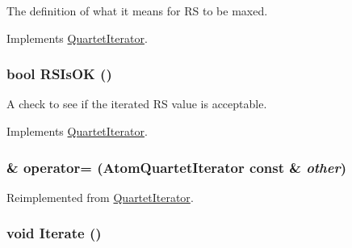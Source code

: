 The definition of what it means for RS to be maxed. 

Implements \hyperlink{classJKBuilder_1_1QuartetIterator_af88c46759ac710bbd36c17601dc62d55}{QuartetIterator}.\hypertarget{classJKBuilder_1_1AtomQuartetIterator_a13e657ea529c0566a0bf48e9c5a488d7}{
\subsubsection[{RSIsOK}]{\setlength{\rightskip}{0pt plus 5cm}bool RSIsOK ()}}
\label{classJKBuilder_1_1AtomQuartetIterator_a13e657ea529c0566a0bf48e9c5a488d7}


A check to see if the iterated RS value is acceptable. 

Implements \hyperlink{classJKBuilder_1_1QuartetIterator_ac51ff9a02f4a201598f7820476c52faf}{QuartetIterator}.\hypertarget{classJKBuilder_1_1AtomQuartetIterator_a39f50a07009d2e9e81e1d64da594084f}{
\subsubsection[{operator=}]{ \& operator= ({\bf AtomQuartetIterator} const \& {\em other})}}
\label{classJKBuilder_1_1AtomQuartetIterator_a39f50a07009d2e9e81e1d64da594084f}


Reimplemented from \hyperlink{classJKBuilder_1_1QuartetIterator_ab3cd17222545586596dbbc6aa3ca7046}{QuartetIterator}.\hypertarget{classJKBuilder_1_1QuartetIterator_a7874a07e98b52f4f147cde6f39353bae}{
\subsubsection[{Iterate}]{\setlength{\rightskip}{0pt plus 5cm}void Iterate ()}}
\label{classJKBuilder_1_1QuartetIterator_a7874a07e98b52f4f147cde6f39353bae}


